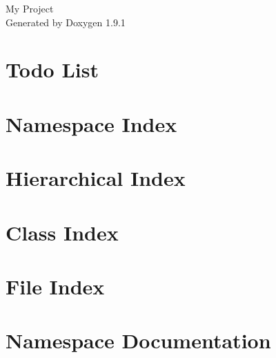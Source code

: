 \let\mypdfximage\pdfximage\def\pdfximage{\immediate\mypdfximage}\documentclass[twoside]{book}
\newcommand{\+}{\discretionary{\mbox{\scriptsize$\hookleftarrow$}}{}{}}
\newcommand{\clearemptydoublepage}{%
  \newpage{\pagestyle{empty}\cleardoublepage}%
}
\begin{document}
\raggedbottom

\hypersetup{pageanchor=false,
             bookmarksnumbered=true,
             pdfencoding=unicode
            }
\begin{titlepage}
\vspace*{7cm}
\begin{center}%
{\Large My Project }\\
\vspace*{1cm}
{\large Generated by Doxygen 1.9.1}\\
\end{center}
\end{titlepage}
\clearemptydoublepage
{}
\tableofcontents
\clearemptydoublepage
{}
\hypersetup{pageanchor=true}

\chapter{Todo List}
\label{todo}

\chapter{Namespace Index}

\chapter{Hierarchical Index}

\chapter{Class Index}

\chapter{File Index}

\chapter{Namespace Documentation}



















\end{document}
